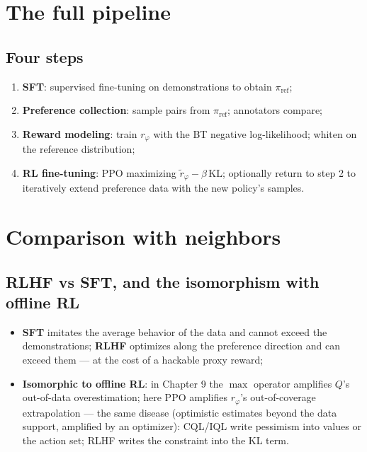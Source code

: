 \documentclass{article}
\begin{document}
\section*{The full pipeline}

\subsection*{Four steps}

\begin{enumerate}
  \item \textbf{SFT}: supervised fine-tuning on demonstrations to obtain $\pi_{\mathrm{ref}}$;
  \item \textbf{Preference collection}: sample pairs from $\pi_{\mathrm{ref}}$; annotators compare;
  \item \textbf{Reward modeling}: train $r_{\varphi}$ with the BT negative log-likelihood; whiten on the reference distribution;
  \item \textbf{RL fine-tuning}: PPO maximizing $\tilde{r}_{\varphi} - \beta\,\mathrm{KL}$; optionally return to step 2 to iteratively extend preference data with the new policy's samples.
\end{enumerate}

\section*{Comparison with neighbors}

\subsection*{RLHF vs SFT, and the isomorphism with offline RL}

\begin{itemize}
  \item \textbf{SFT} imitates the average behavior of the data and cannot exceed the demonstrations; \textbf{RLHF} optimizes along the preference direction and can exceed them --- at the cost of a hackable proxy reward;
  \item \textbf{Isomorphic to offline RL}: in Chapter 9 the $\max$ operator amplifies $Q$'s out-of-data overestimation; here PPO amplifies $r_{\varphi}$'s out-of-coverage extrapolation --- the same disease (optimistic estimates beyond the data support, amplified by an optimizer): CQL/IQL write pessimism into values or the action set; RLHF writes the constraint into the KL term.
\end{itemize}
\end{document}
